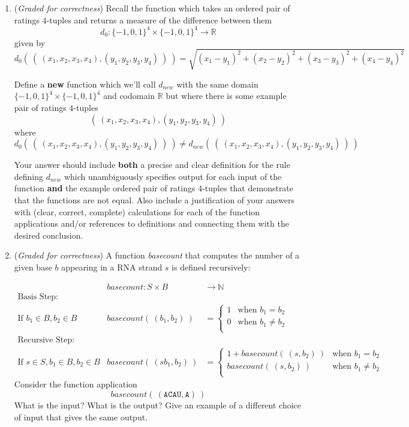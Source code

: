 \documentclass[12pt, oneside]{article}
\newcommand{\gradeCorrect}{({\it Graded for correctness}) }
\newcommand{\A}[0]{\texttt{A}}
\newcommand{\C}[0]{\texttt{C}}
\newcommand{\U}[0]{\texttt{U}}
\begin{document}
\begin{enumerate}[labelindent=0pt, leftmargin=0pt]
\begin{enumerate}
\item\gradeCorrect Recall the function which takes an ordered pair of ratings $4$-tuples and returns a measure of the difference between them
\[
    d_0: \{-1,0,1\}^4 \times \{-1,0,1\}^4 \to \mathbb{R}
\]
given by
\[
d_0 (~(~ (x_1, x_2, x_3, x_4), (y_1, y_2, y_3, y_4) ~) ~) = \sqrt{ (x_1 - y_1)^2 + (x_2 - y_2)^2 + (x_3 -y_3)^2 + (x_4 -y_4)^2}
\]

Define a {\bf new} function which we'll call $d_{new}$ with the same domain $\{-1,0,1\}^4 \times \{-1,0,1\}^4$
and codomain $\mathbb{R}$ but where there is some example pair of ratings $4$-tuples 
\[(~ (x_1, x_2, x_3, x_4), (y_1, y_2, y_3, y_4)~)\]
where
\[
d_0 (~(~ (x_1, x_2, x_3, x_4), (y_1, y_2, y_3, y_4) ~) ~) \neq d_{new} (~(~ (x_1, x_2, x_3, x_4), (y_1, y_2, y_3, y_4) ~) ~)
\]

    Your answer should include  {\bf both} a precise and clear definition for the rule defining
    $d_{new}$ which unambiguously specifies output for each input of the function {\bf and}
    the example ordered pair of ratings $4$-tuples that demonstrate that the functions are not equal.
    Also include a justification 
    of your answers with (clear, correct, complete) calculations for each of the function applications 
    and/or references to definitions and connecting them with
    the desired conclusion.

\item\gradeCorrect A function \textit{basecount} that computes the number of a given base 
$b$ appearing in a RNA strand $s$ is defined recursively:
    
\[
\begin{array}{llll}
& \textit{basecount} : S \times B & \to \mathbb{N} &\\
\textrm{Basis Step:} &  \\
\textrm{If } b_1 \in B, b_2 \in B & \textit{basecount}(~(b_1, b_2)~) & = 
        \begin{cases}
            1 & \textrm{when } b_1 = b_2 \\
            0 & \textrm{when } b_1 \neq b_2 \\
        \end{cases}& \\
\textrm{Recursive Step:} & \\
\textrm{If } s \in S, b_1 \in B, b_2 \in B &\textit{basecount}(~(s b_1, b_2)~) & =
        \begin{cases}
            1 + \textit{basecount}(~(s, b_2)~) & \textrm{when } b_1 = b_2 \\
            \textit{basecount}(~(s, b_2)~) & \textrm{when } b_1 \neq b_2 \\
        \end{cases} &
\end{array}
\]
Consider the function application 
\[
  basecount( ~(\A\C\A\U, \A)~)
\]
What is the input?  What is the output? Give an example of a different choice of input that 
gives the same output.


\end{enumerate}
\end{enumerate}
\end{document}

